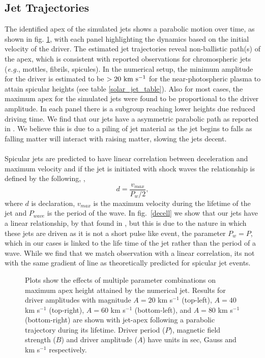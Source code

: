 \documentclass[12pt]{ociamthesis}
\newcommand{\np}{\\ \\}
\begin{document}
\subsection{Jet Trajectories}
\label{subsec:jet_traj}
The identified apex of the simulated jets shows a parabolic motion over time, as shown in fig. \ref{jet_traj}, with each panel highlighting the dynamics based on the initial velocity of the driver. The estimated jet trajectories reveal non-ballistic path(s) of the apex, which is consistent with reported observations \citep{Hansteen2006ApJ, Rouppe2007ApJ660L169R, Pontieu2007PASJ} for chromospheric jets (\textit{e.g.}, mottles, fibrils, spicules). In the numerical setup, the minimum amplitude for the driver is estimated to be $>20 ~\rm{km ~s^{-1}}$ for the near-photospheric plasma to attain spicular heights (see table \ref{solar_jet_table}). Also for most cases, the maximum apex for the simulated jets were found to be proportional to the driver amplitude. In each panel there is a subgroup reaching lower heights due reduced driving time. We find that our jets have a asymmetric parabolic path as reported in \cite{Singh2019}. We believe this is due to a piling of jet material as the jet begins to falls as falling matter will interact with raising matter, slowing the jets decent.
\np  
%
Spicular jets are predicted to have linear correlation between deceleration and maximum velocity and if the jet is initiated with shock waves the relationship is defined by the following, \citep{Heggland2007ApJ6661277H},
\begin{equation} \label{trend_heg}
d = \frac{v_{max}}{P_{w}/2},
\end{equation}
where $d$ is declaration, $v_{max}$ is the maximum velocity during the lifetime of the jet and $P_{wave}$ is the period of the wave. In fig.~\ref{decell} we show that our jets have a linear relationship, by that found in \citep{Heggland2007ApJ6661277H}, but this is due to the nature in which these jets are driven as it is not a short pulse like event, the parameter $P_{w}=P$, which in our cases is linked to the life time of the jet rather than the period of a wave. While we find that we match observation with a linear correlation, its not with the same gradient of line as theoretically predicted for spicular jet events. 
\begin{figure}
\captionsetup[subfigure]{labelformat=empty}
\centering
{} 
\caption{Plots show the effects of multiple parameter combinations on maximum apex height attained by the numerical jet. Results for driver amplitudes with magnitude $A = 20$ km s$^{-1}$ (top-left), $A = 40$ km s$^{-1}$ (top-right), $A = 60$ km s$^{-1}$ (bottom-left), and $A = 80$ km s$^{-1}$ (bottom-right) are shown with jet-apex following a parabolic trajectory during its lifetime. Driver period ($P$), magnetic field strength ($B$) and driver amplitude ($A$) have units in sec, Gauss and km s$^{-1}$ respectively.}
\label{jet_traj}
\end{figure}
\end{document}
